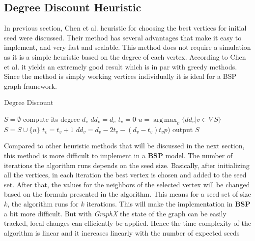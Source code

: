 \documentclass[english]{tktltiki}
\DeclareMathOperator*{\argmax}{arg\,max}
\begin{document}
\subsection{Degree Discount Heuristic}
\label{subsec:degreediscount}
In previous section, Chen et al. \cite{chen09} heuristic for choosing the best vertices for initial seed were discussed. Their method has several advantages that make it easy to implement, and very fast and scalable. This method does not require a simulation as it is a simple heuristic based on the degree of each vertex. According to Chen et al. it yields an extremely good result which is in par with greedy methods. Since the method is simply working vertices individually it is ideal for a BSP graph framework. 
\begin{algorithm}[ht!]
\caption{Degree Discount}
\label{alg:degreedicount}
\begin{algorithmic}
\State $S=\emptyset$
	\State compute its degree $d_v$
 	\State $dd_v=d_v$
 	\State $t_v = 0$
\EndFor
{}
	\State $u = \argmax_v \{dd_v |  v \in V \ S\}$
	\State $S = S \cup \{u\}$
		\State $t_v = t_v + 1$
		\State $dd_v = d_v - 2t_v - (d_v - t_v)t_v p)$
	\EndFor
\EndFor
\State output $S$
\end{algorithmic}
\end{algorithm}
Compared to other heuristic methods that will be discussed in the next section, this method is more difficult to implement in a \textbf{BSP} model. The number of iterations the algorithm runs depends on the seed size. Basically, after initializing all the vertices, in each iteration the best vertex is chosen and added to the seed set. After that, the values for the neighbors of the selected vertex will be changed based on the formula presented in the algorithm. This means for a seed set of size $k$, the algorithm runs for $k$ iterations. This will make the implementation in \textbf{BSP} a bit more difficult. But with \textit{GraphX} the state of the graph can be easily tracked, local changes can efficiently be applied. Hence the time complexity of the algorithm is linear and it increases linearly with the number of expected seeds
\end{document}
